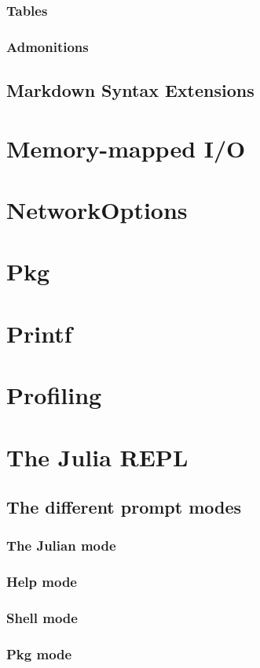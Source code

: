     \subsection{Tables}
    \subsection{Admonitions}
    \section{Markdown Syntax Extensions}
\chapter{Memory-mapped I/O}
\chapter{NetworkOptions}
\chapter{Pkg}
\chapter{Printf}
\chapter{Profiling}
\chapter{The Julia REPL}
    \section{The different prompt modes}
    \subsection{The Julian mode}
    \subsection{Help mode}
    \subsection{Shell mode}
    \subsection{Pkg mode}
